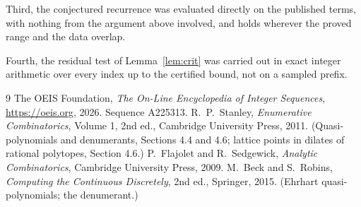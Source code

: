 \documentclass[11pt,a4paper]{article}
\theoremstyle{plain}
\theoremstyle{definition}
\begin{document}
Third, the conjectured recurrence was evaluated directly on the published terms, with
nothing from the argument above involved, and holds wherever the proved range and the data
overlap.

Fourth, the residual test of Lemma~\ref{lem:crit} was carried out in exact integer
arithmetic over every index up to the certified bound, not on a sampled prefix.

\begin{thebibliography}{9}
 The OEIS Foundation, \emph{The On-Line Encyclopedia of Integer
Sequences}, \url{https://oeis.org}, 2026. Sequence A225313.
 R.~P.~Stanley, \emph{Enumerative Combinatorics}, Volume 1, 2nd ed.,
Cambridge University Press, 2011. (Quasi-polynomials and denumerants, Sections 4.4 and 4.6;
lattice points in dilates of rational polytopes, Section 4.6.)
 P.~Flajolet and R.~Sedgewick, \emph{Analytic Combinatorics}, Cambridge
University Press, 2009.
 M.~Beck and S.~Robins, \emph{Computing the Continuous Discretely}, 2nd
ed., Springer, 2015. (Ehrhart quasi-polynomials; the denumerant.)
\end{thebibliography}
\end{document}
